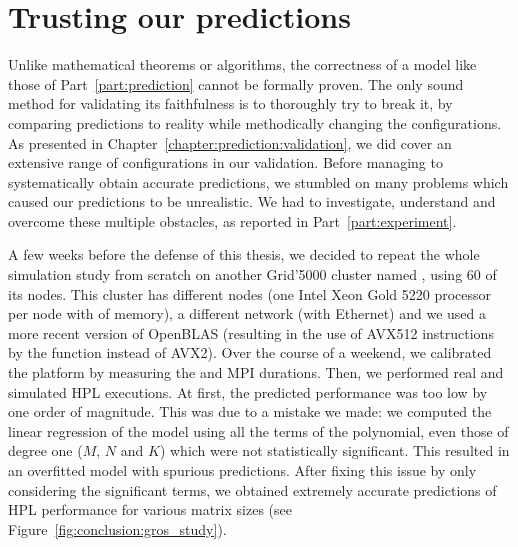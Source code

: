     \section{Trusting our predictions}%
    \label{sec:prediction_trust}

        Unlike mathematical theorems or algorithms, the correctness of a model like those of Part~\ref{part:prediction}
        cannot be formally proven. The only sound method for validating its faithfulness is to thoroughly try to break
        it, by comparing predictions to reality while methodically changing the configurations. As presented in
        Chapter~\ref{chapter:prediction:validation}, we did cover an extensive range of configurations in our
        validation. Before managing to systematically obtain accurate predictions, we stumbled on many problems which
        caused our predictions to be unrealistic. We had to investigate, understand and overcome these multiple
        obstacles, as reported in Part~\ref{part:experiment}.

        A few weeks before the defense of this thesis, we decided to repeat the whole simulation study from scratch on
        another Grid'5000 cluster named \gros, using 60 of its nodes. This cluster has different nodes (one Intel Xeon
        Gold 5220 processor per node with  of memory), a different network (with
         Ethernet) and we used a more recent version of OpenBLAS (resulting in the use of
        AVX512 instructions by the \dgemm function instead of AVX2). Over the course of a weekend, we calibrated the
        platform by measuring the \dgemm and MPI durations. Then, we performed real and simulated HPL executions. At
        first, the predicted performance was too low by one order of magnitude. This was due to a mistake we made: we
        computed the linear regression of the \dgemm model using all the terms of the polynomial, even those of degree
        one (\ie \(M\), \(N\) and \(K\)) which were not statistically significant. This resulted in an overfitted model
        with spurious predictions.  After fixing this issue by only considering the significant terms, we obtained
        extremely accurate predictions of HPL performance for various matrix sizes (see
        Figure~\ref{fig:conclusion:gros_study}).

